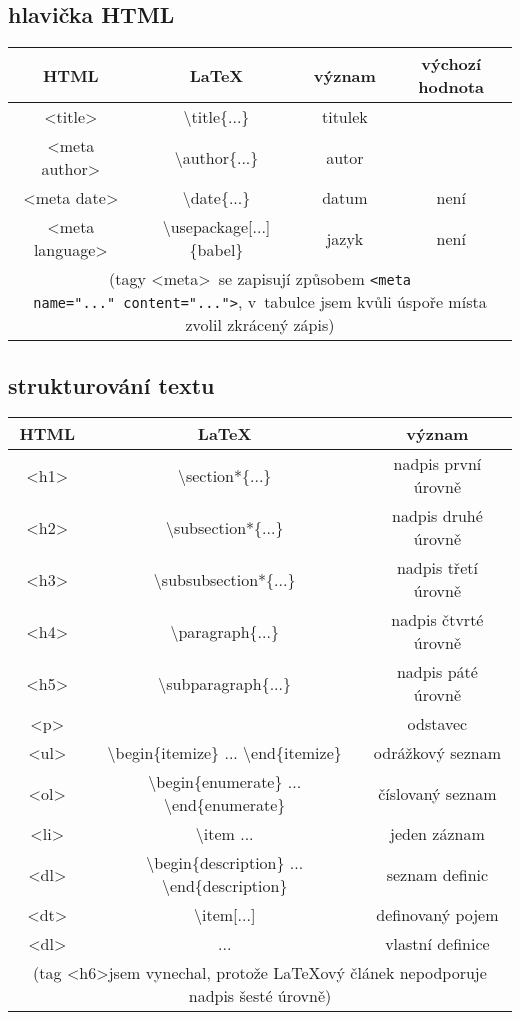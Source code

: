 \documentclass[a4paper,12pt]{article}
\newcommand{\zl}{\textbackslash}
\newcommand{\ls}{\textless}
\newcommand{\ps}{\textgreater}
\begin{document}
	\subsection{hlavička HTML}
	\begin{tabular}{|c|c|c|c|}
		\hline
		\textbf{HTML} & \textbf{\LaTeX} & \textbf{význam} & \textbf{výchozí hodnota} \\
		\hline
		\ls title\ps & \zl title\{...\} & titulek & \uv{empty} \\
		\hline
		\ls meta author\ps & \zl author\{...\} & autor & \uv{unknown} \\
		\hline
		\ls meta date\ps & \zl date\{...\} & datum & není \\
		\hline
		\ls meta language\ps & \zl usepackage[...]\{babel\} & jazyk & není \\
		\hline
		\multicolumn{4}{p{14cm}}{(tagy \ls meta\ps~se zapisují způsobem \texttt{\ls meta name="..."~content="..."\ps}, v~tabulce jsem kvůli úspoře místa zvolil zkrácený zápis)}
		\end{tabular}	\subsection{strukturování textu}
	\begin{tabular}{|c|c|c|}
		\hline
		\textbf{HTML} & \textbf{\LaTeX} & \textbf{význam} \\
		\hline
		\ls h1\ps & \zl section*\{...\} & nadpis první úrovně \\
		\hline
		\ls h2\ps & \zl subsection*\{...\} & nadpis druhé úrovně \\
		\hline
		\ls h3\ps & \zl subsubsection*\{...\} & nadpis třetí úrovně \\
		\hline
		\ls h4\ps & \zl paragraph\{...\} & nadpis čtvrté úrovně \\
		\hline
		\ls h5\ps & \zl subparagraph\{...\} & nadpis páté úrovně \\
		\hline
		\ls p\ps & \uv{prázdný řádek} & odstavec \\
		\hline
		\ls ul\ps & \zl begin\{itemize\} ... \zl end\{itemize\} & odrážkový seznam \\
		\hline
		\ls ol\ps & \zl begin\{enumerate\} ... \zl end\{enumerate\} & číslovaný seznam \\
		\hline
		\ls li\ps & \zl item ... & jeden záznam \\
		\hline
		\ls dl\ps & \zl begin\{description\} ... \zl end\{description\} & seznam definic \\
		\hline
		\ls dt\ps & \zl item[...] & definovaný pojem \\
		\hline
		\ls dl\ps & ... & vlastní definice \\
		\hline
		\multicolumn{3}{p{8cm}}{(tag \ls h6\ps jsem vynechal, protože LaTeXový článek nepodporuje nadpis šesté úrovně)}
	\end{tabular}
\end{document}
